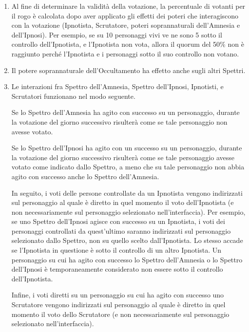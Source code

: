 \documentclass[a4paper,10pt]{article}
\begin{document}
\begin{enumerate}
	\item Al fine di determinare la validità della votazione, la percentuale di votanti per il rogo è calcolata dopo aver applicato gli effetti dei poteri che interagiscono con la votazione (Ipnotista, Scrutatore, poteri soprannaturali dell'Amnesia e dell'Ipnosi).
	Per esempio, se su 10 personaggi vivi ve ne sono 5 sotto il controllo dell'Ipnotista, e l'Ipnotista non vota, allora il quorum del 50\% non è raggiunto perché l'Ipnotista e i personaggi sotto il suo controllo non votano.
	
	\item Il potere soprannaturale dell'Occultamento ha effetto anche sugli altri Spettri.
	
	\item Le interazioni fra Spettro dell'Amnesia, Spettro dell'Ipnosi, Ipnotisti, e Scrutatori funzionano nel modo seguente.
	
	Se lo Spettro dell'Amnesia ha agito con successo su un personaggio, durante la votazione del giorno successivo risulterà come se tale personaggio non avesse votato.
	
	Se lo Spettro dell'Ipnosi ha agito con un successo su un personaggio, durante la votazione del giorno successivo risulterà come se tale personaggio avesse votato come indicato dallo Spettro, a meno che su tale personaggio non abbia agito con successo anche lo Spettro dell'Amnesia.
	
	In seguito, i voti delle persone controllate da un Ipnotista vengono indirizzati sul personaggio al quale è diretto in quel momento il voto dell'Ipnotista (e non necessariamente sul personaggio selezionato nell'interfaccia). Per esempio, se uno Spettro dell'Ipnosi agisce con successo su un Ipnotista, i voti dei personaggi controllati da quest'ultimo saranno indirizzati sul personaggio selezionato dallo Spettro, non su quello scelto dall'Ipnotista. Lo stesso accade se l'Ipnotista in questione è sotto il controllo di un altro Ipnotista. Un personaggio su cui ha agito con successo lo Spettro dell'Amnesia o lo Spettro dell'Ipnosi è temporaneamente considerato non essere sotto il controllo dell'Ipnotista.
	
	Infine, i voti diretti su un personaggio su cui ha agito con successo uno Scrutatore vengono indirizzati sul personaggio al quale è diretto in quel momento il voto dello Scrutatore (e non necessariamente sul personaggio selezionato nell'interfaccia).
	

\end{enumerate}
\end{document}
